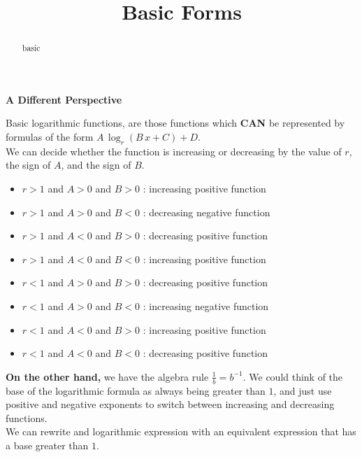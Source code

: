 \documentclass{ximera}
\title{Basic Forms}
\begin{document}
\begin{abstract}
basic
\end{abstract}
\maketitle






\textbf{\textcolor{blue!55!black}{A Different Perspective}} 


Basic logarithmic functions, are those functions which \textbf{\textcolor{red!80!black}{CAN}} be represented by formulas of the form $A \, \log_r(B \, x + C) + D$.  \\


We can decide whether the function is increasing or decreasing by the value of $r$, the sign of $A$, and the sign of $B$. \\





\begin{itemize}
\item $r > 1$ and $A > 0$ and $B > 0$ : increasing positive function
\item $r > 1$ and $A > 0$ and $B < 0$ : decreasing negative function  
\item $r > 1$ and $A < 0$ and $B > 0$ : decreasing positive function
\item $r > 1$ and $A < 0$ and $B < 0$ : increasing positive function
\item $r < 1$ and $A > 0$ and $B > 0$ : decreasing positive function
\item $r < 1$ and $A > 0$ and $B < 0$ : increasing negative function  
\item $r < 1$ and $A < 0$ and $B > 0$ : increasing positive function
\item $r < 1$ and $A < 0$ and $B < 0$ : decreasing positive function
\end{itemize}





\textbf{On the other hand,} we have the algebra rule $\frac{1}{b} = b^{-1}$.  We could think of the base of the logarithmic formula as always being greater than $1$, and just use positive and negative exponents to switch between increasing and decreasing functions. \\

We can rewrite and logarithmic expression with an equivalent expression that has a base greater than $1$. \\
\end{document}

